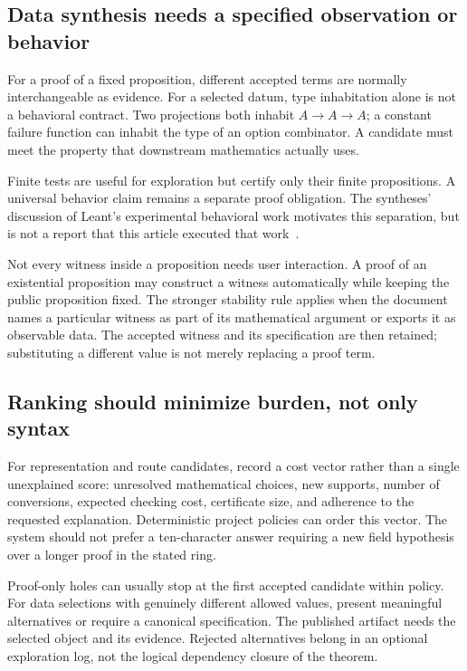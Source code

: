\documentclass[11pt,a4paper]{article}
\theoremstyle{definition}
\begin{document}
\subsection{Data synthesis needs a specified observation or behavior}
For a proof of a fixed proposition, different accepted terms are normally
interchangeable as evidence. For a selected datum, type inhabitation alone is not
a behavioral contract. Two projections both inhabit \(A\to A\to A\); a constant
failure function can inhabit the type of an option combinator. A candidate must
meet the property that downstream mathematics actually uses.

Finite tests are useful for exploration but certify only their finite
propositions. A universal behavior claim remains a separate proof obligation.
The syntheses' discussion of Leant's experimental behavioral work motivates this
separation, but is not a report that this article executed that work~\cite{synthesis,blueprints}.

Not every witness inside a proposition needs user interaction. A proof of an
existential proposition may construct a witness automatically while keeping the
public proposition fixed. The stronger stability rule applies when the document
names a particular witness as part of its mathematical argument or exports it as
observable data. The accepted witness and its specification are then retained;
substituting a different value is not merely replacing a proof term.

\subsection{Ranking should minimize burden, not only syntax}
For representation and route candidates, record a cost vector rather than a
single unexplained score: unresolved mathematical choices, new supports, number
of conversions, expected checking cost, certificate size, and adherence to the
requested explanation. Deterministic project policies can order this vector.
The system should not prefer a ten-character answer requiring a new field
hypothesis over a longer proof in the stated ring.

Proof-only holes can usually stop at the first accepted candidate within policy.
For data selections with genuinely different allowed values, present meaningful
alternatives or require a canonical specification. The published artifact needs
the selected object and its evidence. Rejected alternatives belong in an optional
exploration log, not the logical dependency closure of the theorem.
\end{document}
